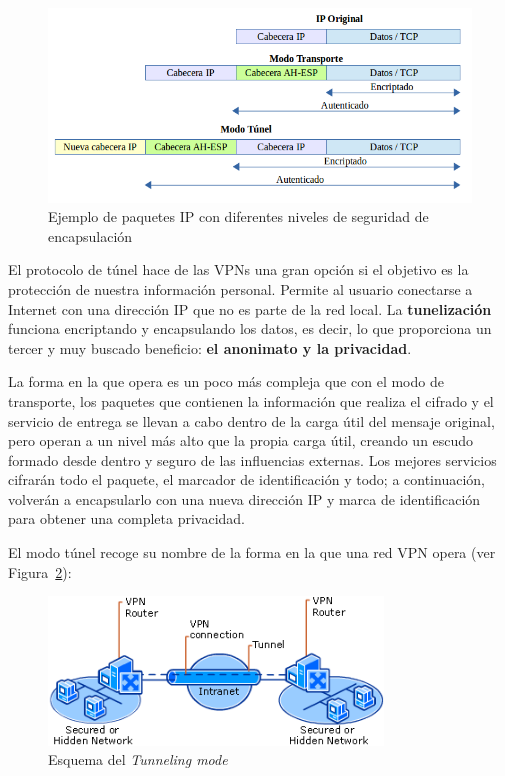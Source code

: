 	\begin{figure}[H]
		\centerline{
			\mbox{\includegraphics[width=5.00in]{images/IPsec.png}}
		}
		\caption{Ejemplo de paquetes IP con diferentes niveles de seguridad de encapsulación~\cite{article:ibm_ip}}
		\label{fig:IPtypes}
	\end{figure}

El protocolo de túnel hace de las VPNs una gran opción si el objetivo es la protección de nuestra información personal. 
Permite al usuario conectarse a Internet con una dirección IP que no es parte de la red local. La \textbf{tunelización} funciona encriptando y encapsulando los datos, es decir, lo que proporciona un tercer y muy buscado beneficio: \textbf{el anonimato y la privacidad}. 

La forma en la que opera es un poco más compleja que con el modo de transporte, los paquetes que contienen la información que realiza el cifrado y el servicio de entrega se llevan a cabo dentro de la carga útil del mensaje original, pero operan a un nivel más alto que la propia carga útil, creando un escudo formado desde dentro y seguro de las influencias externas. Los mejores servicios cifrarán todo el paquete, el marcador de identificación y todo; a continuación, volverán a encapsularlo con una nueva dirección IP y marca de identificación para obtener una completa privacidad.

El modo túnel recoge su nombre de la forma en la que una red VPN opera (ver Figura~\ref{fig:tunnelMode}):

  		\begin{figure}[H]
  			\centerline{
  				\mbox{\includegraphics[width=3.50in]{images/vpn.png}}
  			}
  			\caption{Esquema del \textit{Tunneling mode}~\cite{article:tunnelMode}}
  			\label{fig:tunnelMode}
  		\end{figure}
 
